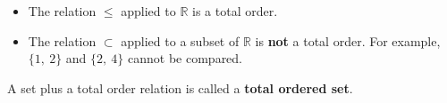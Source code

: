 \documentclass[12pt, a4paper]{book}
\begin{document}
\begin{exmp}
  \begin{itemize}
    \item The relation $\leq$ applied to $\mathbb{R}$ is a total order.
    \item The relation $\subset$ applied to a subset of $\mathbb{R}$ is \textbf{not} a total order. For example, $\{1, \ 2\}$ and $\{2, \ 4\}$ cannot be compared.  
  \end{itemize}
\end{exmp}

\begin{defn}
  A set plus a total order relation is called a \textbf{total ordered set}.
\end{defn}
\end{document}
